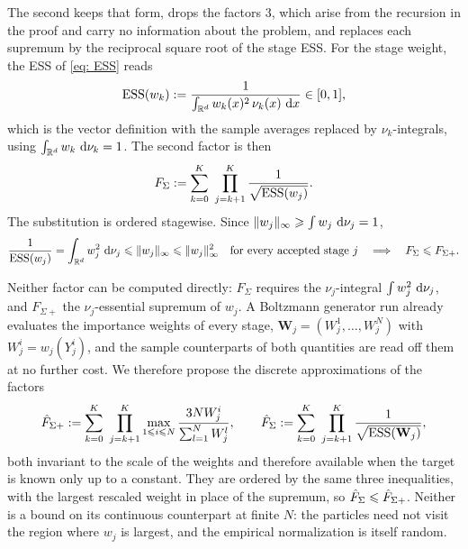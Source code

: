 \documentclass{article}
\begin{document}
The second keeps that form, drops the factors $3$, which arise from the recursion in the proof and carry no information about the problem, and replaces each supremum by the reciprocal square root of the stage ESS. For the stage weight, the ESS of \eqref{eq: ESS} reads
\begin{equation}
    \mathrm{ESS}(w_k) := \frac{1}{\int_{\mathbb R^d} w_k(x)^2 \, \nu_k(x) \, \,\mathrm d x} \in [0,1] ,
    \label{eq: propagation-ESS}
\end{equation}
which is the vector definition with the sample averages replaced by $\nu_k$-integrals, using $\int_{\mathbb R^d} w_k \, \,\mathrm d\nu_k = 1$. The second factor is then
\begin{equation}
    F_{\Sigma}
    := \sum_{k=0}^{K}\ \prod_{j=k+1}^{K} \frac{1}{\sqrt{\mathrm{ESS}(w_j)}} .
    \label{eq: propagation-factor-sigma}
\end{equation}
The substitution is ordered stagewise. Since $\lVert w_j \rVert_\infty \geqslant \int w_j \, \,\mathrm d\nu_j = 1$,
\begin{equation*}
    \frac{1}{\mathrm{ESS}(w_j)} = \int_{\mathbb R^d} w_j^2 \, \,\mathrm d\nu_j \leqslant \lVert w_j \rVert_\infty \leqslant \lVert w_j \rVert_\infty^{2}
    \quad\text{for every accepted stage } j
    \quad\Longrightarrow\quad
    F_\Sigma \leqslant F_{\Sigma+} .
\end{equation*}

Neither factor can be computed directly: $F_\Sigma$ requires the $\nu_j$-integral $\int w_j^2 \, \,\mathrm d\nu_j$, and $F_{\Sigma+}$ the $\nu_j$-essential supremum of $w_j$. A Boltzmann generator run already evaluates the importance weights of every stage, $\mathbf W_j = (W_j^1,\dots,W_j^N)$ with $W_j^i = w_j(Y_j^i)$, and the sample counterparts of both quantities are read off them at no further cost. We therefore propose the discrete approximations of the factors
\begin{equation}
    \hat F_{\Sigma+} := \sum_{k=0}^{K}\ \prod_{j=k+1}^{K}  \max_{1 \Le i \Le N} \frac{3N W_j^i}{\sum_{l=1}^{N} W_j^l} ,
    \qquad
    \hat F_{\Sigma} := \sum_{k=0}^{K}\ \prod_{j=k+1}^{K} \frac{1}{\sqrt{\ESS(\mathbf W_j)}} ,
    \label{eq: propagation-factor-hat}
\end{equation}
both invariant to the scale of the weights and therefore available when the target is known only up to a constant. They are ordered by the same three inequalities, with the largest rescaled weight in place of the supremum, so $\hat F_\Sigma \leqslant \hat F_{\Sigma+}$. Neither is a bound on its continuous counterpart at finite $N$: the particles need not visit the region where $w_j$ is largest, and the empirical normalization is itself random.
\end{document}
